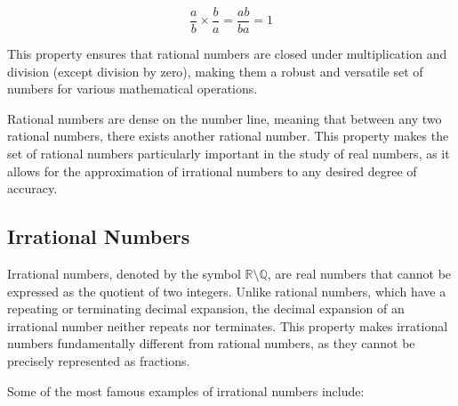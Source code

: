 \[
\frac{a}{b} \times \frac{b}{a} = \frac{ab}{ba} = 1
\]

This property ensures that rational numbers are closed under multiplication and division (except division by zero), making them a robust and versatile set of numbers for various mathematical operations.

Rational numbers are dense on the number line, meaning that between any two rational numbers, there exists another rational number. This property makes the set of rational numbers particularly important in the study of real numbers, as it allows for the approximation of irrational numbers to any desired degree of accuracy.

\subsection*{Irrational Numbers}
Irrational numbers, denoted by the symbol $\mathbb{R} \setminus \mathbb{Q}$, are real numbers that cannot be expressed as the quotient of two integers. Unlike rational numbers, which have a repeating or terminating decimal expansion, the decimal expansion of an irrational number neither repeats nor terminates. This property makes irrational numbers fundamentally different from rational numbers, as they cannot be precisely represented as fractions.

Some of the most famous examples of irrational numbers include:

